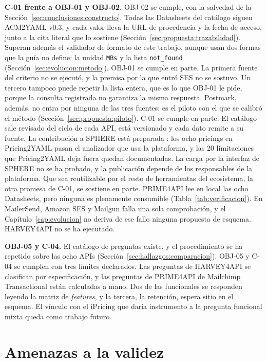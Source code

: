 \textbf{C-01 frente a OBJ-01 y OBJ-02.} OBJ-02 se cumple, con la salvedad de la Sección~\ref{sec:conclusiones:constructo}.
Todas las Datasheets del catálogo siguen ACM2YAML v0.3, y cada valor lleva la URL de procedencia y la fecha de acceso, junto a la cita literal que lo sostiene (Sección~\ref{sec:propuesta:trazabilidad}).
Superan además el validador de formato de este trabajo, aunque usan dos formas que la guía no define: la unidad \texttt{MBs} y la lista \texttt{not\_found} (Sección~\ref{sec:evolucion:metodo}).
OBJ-01 se cumple en parte.
La primera fuente del criterio no se ejecutó, y la premisa por la que entró SES no se sostuvo.
Un tercero tampoco puede repetir la lista entera, que es lo que OBJ-01 le pide, porque la consulta registrada no garantiza la misma respuesta.
Postmark, además, no entra por ninguna de las tres fuentes: es el piloto con el que se calibró el método (Sección~\ref{sec:propuesta:piloto}).
C-01 se cumple en parte.
El catálogo sale revisado del ciclo de cada API, está versionado y cada dato remite a su fuente.
La contribución a SPHERE está preparada \citep{sphere}: los ocho pricings en Pricing2YAML pasan el analizador que usa la plataforma, y las 20 limitaciones que Pricing2YAML deja fuera quedan documentadas.
La carga por la interfaz de SPHERE no se ha probado, y la publicación depende de los responsables de la plataforma.
Que sea reutilizable por el resto de herramientas del ecosistema, la otra promesa de C-01, se sostiene en parte.
PRIME4API lee en local las ocho Datasheets, pero ninguna es plenamente consumible (Tabla~\ref{tab:verificacion}).
En MailerSend, Amazon SES y Mailgun falla una sola comprobación, y el Capítulo~\ref{cap:evolucion} no deriva de ese fallo ninguna propuesta de esquema.
HARVEY4API no se ha ejecutado.

\textbf{OBJ-05 y C-04.} El catálogo de preguntas existe, y el procedimiento se ha repetido sobre las ocho APIs (Sección~\ref{sec:hallazgos:comparacion}).
OBJ-05 y C-04 se cumplen con tres límites declarados.
Las preguntas de HARVEY4API se clasifican por especificación, y las preguntas de PRIME4API de Mailchimp Transactional están calculadas a mano.
Dos de las funcionales se responden leyendo la matriz de \textit{features}, y la tercera, la retención, espera sitio en el esquema.
El vínculo con el iPricing que daría instrumento a la pregunta funcional mixta queda como trabajo futuro.

\section{Amenazas a la validez}\label{sec:conclusiones:amenazas}

